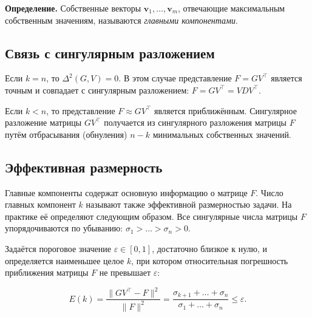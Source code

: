 \documentclass[11pt,a4paper]{article}
\renewcommand{\linethickness}{0.1ex}
\begin{document}
\textbf{Определение.} Собственные векторы
\(\mathbf{v}_1, \ldots, \mathbf{v}_m\), отвечающие максимальным
собственным значениям, называются \emph{главными компонентами}.

    \hypertarget{ux441ux432ux44fux437ux44c-ux441-ux441ux438ux43dux433ux443ux43bux44fux440ux43dux44bux43c-ux440ux430ux437ux43bux43eux436ux435ux43dux438ux435ux43c}{%
\subsection{Связь с сингулярным
разложением}\label{ux441ux432ux44fux437ux44c-ux441-ux441ux438ux43dux433ux443ux43bux44fux440ux43dux44bux43c-ux440ux430ux437ux43bux43eux436ux435ux43dux438ux435ux43c}}

Если \(k = n\), то \(\Delta^2(G, V) = 0\). В этом случае представление
\(F = G V^\top\) является точным и совпадает с сингулярным разложением:
\(F = G V^\top = V D V^\top\).

Если \(k < n\), то представление \(F \approx G V^\top\) является
приближённым. Сингулярное разложение матрицы \(G V^\top\) получается из
сингулярного разложения матрицы \(F\) путём отбрасывания (обнуления)
\(n − k\) минимальных собственных значений.

    \hypertarget{ux44dux444ux444ux435ux43aux442ux438ux432ux43dux430ux44f-ux440ux430ux437ux43cux435ux440ux43dux43eux441ux442ux44c}{%
\subsection{Эффективная
размерность}\label{ux44dux444ux444ux435ux43aux442ux438ux432ux43dux430ux44f-ux440ux430ux437ux43cux435ux440ux43dux43eux441ux442ux44c}}

Главные компоненты содержат основную информацию о матрице \(F\). Число
главных компонент \(k\) называют также эффективной размерностью задачи.
На практике её определяют следующим образом. Все сингулярные числа
матрицы \(F\) упорядочиваются по убыванию:
\(\sigma_1 > \ldots > \sigma_n > 0\).

Задаётся пороговое значение \(\varepsilon \in [0, 1]\), достаточно
близкое к нулю, и определяется наименьшее целое \(k\), при котором
относительная погрешность приближения матрицы \(F\) не превышает
\(\varepsilon\):

\[
  E(k) = \frac{\|G V^\top − F\|^2}{\|F\|^2} = \frac{\sigma_{k+1} + \ldots + \sigma_n}{\sigma_1 + \ldots + \sigma_n} \le \varepsilon.
\]

\end{document}
